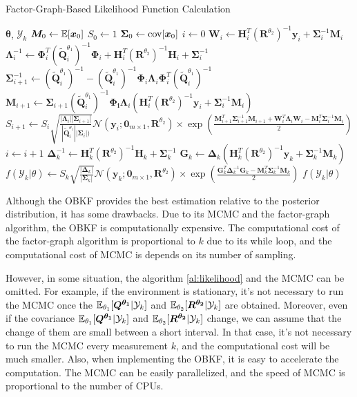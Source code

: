 \begin{algorithm}[H]
\caption{Factor-Graph-Based Likelihood Function Calculation}
\begin{algorithmic}[1]
    \label{al:likelihood}
\REQUIRE $\bm{\theta}$, $\mathcal{Y}_k$
\STATE $\bm{ M}_0 \leftarrow \mathbb{E}[\bm{ x}_0]$
\STATE $S_0 \leftarrow 1$
\STATE $\bm { \Sigma}_0 \leftarrow {\rm cov}[\bm{ x}_0]$
\STATE $i \leftarrow 0$
    \STATE $\bm{ W}_i\leftarrow \bm{ H}_i^T(\bm{ R}^{\theta_2})^{-1}\bm{ y}_i + \bm { \Sigma}_i^{-1}\bm{ M}_i$
    \STATE $\bm{ \Lambda}_i^{-1}\leftarrow \bm{ \Phi}_i^T(\bm{ \tilde Q}_i^{\theta_1})^{-1}\bm{ \Phi}_i + \bm{ H}_i^{T}(\bm{ R}^{\theta_2})^{-1}\bm{ H}_i+\bm { \Sigma}_i^{-1}$
    \STATE $\bm { \Sigma}_{i+1}^{-1}\leftarrow (\bm{ \tilde Q}_i^{\theta_1})^{-1} - (\bm{ \tilde Q}_i^{\theta_1})^{-1}\bm{ \Phi}_i\bm{ \Lambda}_i\bm{ \Phi}_i^T(\bm{ \tilde Q}_i^{\theta_1})^{-1}$
    \STATE $\bm{ M}_{i+1}\leftarrow \bm { \Sigma}_{i+1}(\bm{ \tilde Q}_i^{\theta_1})^{-1}\bm{ \Phi_i}\bm{ \Lambda}_i(\bm{ H}_i^T(\bm{ R}^{\theta_2})^{-1}\bm{ y}_i+\bm { \Sigma}_i^{-1}\bm{ M}_i)$
    \STATE $S_{i+1} \leftarrow S_i\sqrt{\frac{|\bm{\Lambda}_i||\bm{\Sigma}_{i+1}|}{|\bm{ \tilde Q}_i^{\theta_1}||\bm{\Sigma}_i|)}}\mathcal{N}(\bm{y}_i;\bm{0}_{m\times1},\bm{R}^{{\theta}_2})\times\exp(\frac{\bm{M}^T_{i+1}\bm{\Sigma}^{-1}_{i+1}\bm{M}_{i+1}+\bm{W}^T_{i}\bm{\Lambda}_{i}\bm{W}_{i}-\bm{M}^T_{i}\bm{\Sigma}^{-1}_{i}\bm{M}_{i}}{2})$
    \STATE $i \leftarrow i+1$
\ENDWHILE
\STATE $\bm{ \Delta}_k^{-1}\leftarrow \bm{ H}_k^T(\bm{ R}^{\theta_2})^{-1}\bm{ H}_k + \bm { \Sigma}_k^{-1}$
\STATE $\bm{ G}_k \leftarrow \bm{ \Delta}_k(\bm{ H}_k^T(\bm{ R}^{\theta_2})^{-1}\bm{ y}_k + \bm { \Sigma}_k^{-1}\bm{ M}_k)$
\STATE $f(\mathcal{Y}_k|\theta) \leftarrow S_k\sqrt{\frac{|\bm{\Delta}_k|}{|\bm{\Sigma}_k|}}\mathcal{N}(\bm{y}_k;\bm {0}_{m\times 1}, \bm{R}^{{\theta}_2})\times \exp(\frac{\bm{G}^T_{k}\bm{\Delta}^{-1}_{k}\bm{G}_{k}-\bm{M}^T_{k}\bm{\Sigma}^{-1}_{k}\bm{M}_{k}}{2})$
\ENSURE $f(\mathcal{Y}_k|\theta)$
\end{algorithmic}
\end{algorithm}

Although the OBKF provides the best estimation relative to the posterior distribution, it has some drawbacks. Due to its MCMC and the factor-graph algorithm, the OBKF is computationally expensive. The computational cost of the factor-graph algorithm is proportional to $k$ due to its while loop, and the computational cost of MCMC is depends on its number of sampling. 

However, in some situation, the algorithm \ref{al:likelihood} and the MCMC can be omitted. For example, if the environment is stationary, it's not necessary to run the MCMC once the $\mathbb{E}_{\theta_1}[\bm {Q^{\theta_1}}|\mathcal{Y}_k]$ and $\mathbb{E}_{\theta_2}[\bm{R^{\theta_2}}|\mathcal{Y}_k]$ are obtained. 
Moreover, even if the covariance $\mathbb{E}_{\theta_1}[\bm {Q^{\theta_1}}|\mathcal{Y}_k]$ and $\mathbb{E}_{\theta_2}[\bm{R^{\theta_2}}|\mathcal{Y}_k]$ change, we can assume that the change of them are small between a short interval. In that case, it's not necessary to run the MCMC every measurement $k$, and the computational cost will be much smaller. Also, when implementing the OBKF, it is easy to accelerate the computation. The MCMC can be easily parallelized, and the speed of MCMC is proportional to the number of CPUs.